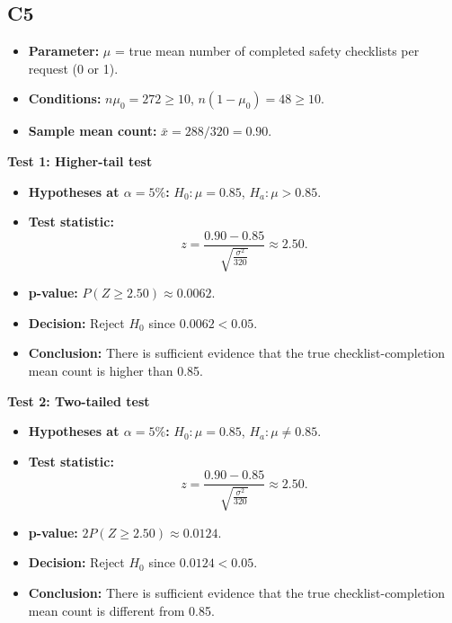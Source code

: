 \subsection*{C5}
\begin{itemize}
	\item \textbf{Parameter:} \(\mu\) = true mean number of completed safety checklists per request (0 or 1).
	\item \textbf{Conditions:} \(n\mu_0=272\ge10\), \(n(1-\mu_0)=48\ge10\).
	\item \textbf{Sample mean count:} \(\bar x=288/320=0.90\).
\end{itemize}

\textbf{Test 1: Higher-tail test}

\begin{itemize}
	\item \textbf{Hypotheses at \(\alpha=5\%\):} \(H_0\colon \mu=0.85\), \(H_a\colon \mu>0.85\).
	\item \textbf{Test statistic:}
	\[
	z=\frac{0.90-0.85}{\sqrt{\frac{\sigma^2}{320}}}\approx 2.50.
	\]
	\item \textbf{p-value:} \(P(Z\ge 2.50)\approx 0.0062\).
	\item \textbf{Decision:} Reject \(H_0\) since \(0.0062<0.05\).
	\item \textbf{Conclusion:} There is sufficient evidence that the true checklist-completion mean count is higher than 0.85.
\end{itemize}

\begin{center}
\end{center}


\textbf{Test 2: Two-tailed test}

\begin{itemize}
	\item \textbf{Hypotheses at \(\alpha=5\%\):} \(H_0\colon \mu=0.85\), \(H_a\colon \mu\ne0.85\).
	\item \textbf{Test statistic:}
	\[
	z=\frac{0.90-0.85}{\sqrt{\frac{\sigma^2}{320}}}\approx 2.50.
	\]
	\item \textbf{p-value:} \(2P(Z\ge 2.50)\approx 0.0124\).
	\item \textbf{Decision:} Reject \(H_0\) since \(0.0124<0.05\).
	\item \textbf{Conclusion:} There is sufficient evidence that the true checklist-completion mean count is different from 0.85.
\end{itemize}

